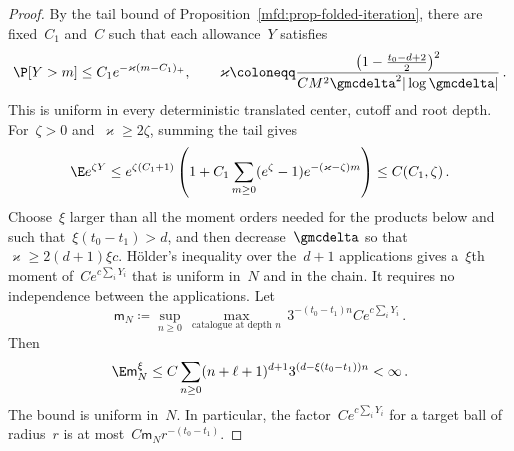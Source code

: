 \documentclass[11pt]{amsart}
\begin{document}
\begin{proof}
\smallskip

By the tail bound of Proposition~\ref{mfd:prop-folded-iteration}, there are fixed~$C_1$ and~$C$ such that each allowance~$Y$ satisfies
\begin{equation*}
	\P[Y>m]\leq C_1 e^{-\varkappa(m-C_1)_+},\qquad
	\varkappa\coloneqq\frac{\bigl(1-\frac{t_0-d+2}{2}\bigr)^2}{CM^2\gmcdelta^2|\log\gmcdelta|}\,.
\end{equation*}
This is uniform in every deterministic translated center, cutoff and root depth. For~$\zeta>0$ and~$\varkappa\geq2\zeta$, summing the tail gives
\begin{equation*}
	\E e^{\zeta Y}\leq e^{\zeta(C_1+1)}
	\left(1+C_1\sum_{m\geq0}(e^\zeta-1)e^{-(\varkappa-\zeta)m}\right)
	\leq C(C_1,\zeta)\,.
\end{equation*}
Choose~$\xi$ larger than all the moment orders needed for the products below and such that~$\xi(t_0-t_1)>d$, and then decrease~$\gmcdelta$ so that~$\varkappa\geq2(d+1)\xi c$. H\"older's inequality over the~$d+1$ applications gives a~$\xi$th moment of~$Ce^{c\sum_iY_i}$ that is uniform in~$N$ and in the chain. It requires no independence between the applications. Let
\begin{equation*}
	\mathsf m_N\coloneqq\sup_{n\geq0}\,\max_{\text{catalogue at depth }n}\,3^{-(t_0-t_1)n}Ce^{c\sum_iY_i}\,.
\end{equation*}
Then
\begin{equation*}
	\E\mathsf m_N^\xi\leq C\sum_{n\geq0}
	(n+\ell+1)^{d+1}3^{(d-\xi(t_0-t_1))n}<\infty\,.
\end{equation*}
The bound is uniform in~$N$. In particular, the factor~$Ce^{c\sum_iY_i}$ for a target ball of radius~$r$ is at most~$C\mathsf m_Nr^{-(t_0-t_1)}$.

\smallskip


\end{proof}
\end{document}
